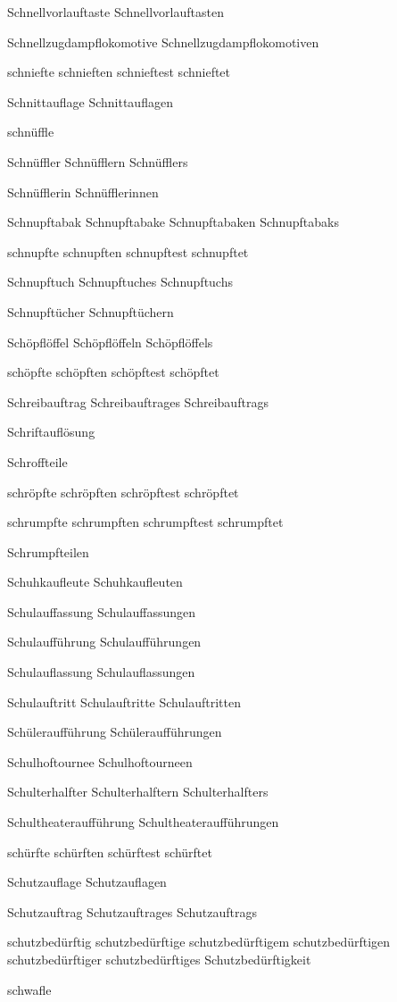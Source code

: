 Schnellvorlauftaste
Schnellvorlauftasten

Schnellzugdampflokomotive
Schnellzugdampflokomotiven

schniefte
schnieften
schnieftest
schnieftet

Schnittauflage
Schnittauflagen

schnüffle

Schnüffler
Schnüfflern
Schnüfflers

Schnüfflerin
Schnüfflerinnen

Schnupftabak
Schnupftabake
Schnupftabaken
Schnupftabaks

schnupfte
schnupften
schnupftest
schnupftet

Schnupftuch
Schnupftuches
Schnupftuchs

Schnupftücher
Schnupftüchern

Schöpflöffel
Schöpflöffeln
Schöpflöffels

schöpfte
schöpften
schöpftest
schöpftet

Schreibauftrag
Schreibauftrages
Schreibauftrags

Schriftauflösung

Schroffteile

schröpfte
schröpften
schröpftest
schröpftet

schrumpfte
schrumpften
schrumpftest
schrumpftet

Schrumpfteilen

Schuhkaufleute
Schuhkaufleuten

Schulauffassung
Schulauffassungen

Schulaufführung
Schulaufführungen

Schulauflassung
Schulauflassungen

Schulauftritt
Schulauftritte
Schulauftritten

Schüleraufführung
Schüleraufführungen

Schulhoftournee
Schulhoftourneen

Schulterhalfter
Schulterhalftern
Schulterhalfters

Schultheateraufführung
Schultheateraufführungen

schürfte
schürften
schürftest
schürftet

Schutzauflage
Schutzauflagen

Schutzauftrag
Schutzauftrages
Schutzauftrags

schutzbedürftig
schutzbedürftige
schutzbedürftigem
schutzbedürftigen
schutzbedürftiger
schutzbedürftiges
Schutzbedürftigkeit

schwafle

